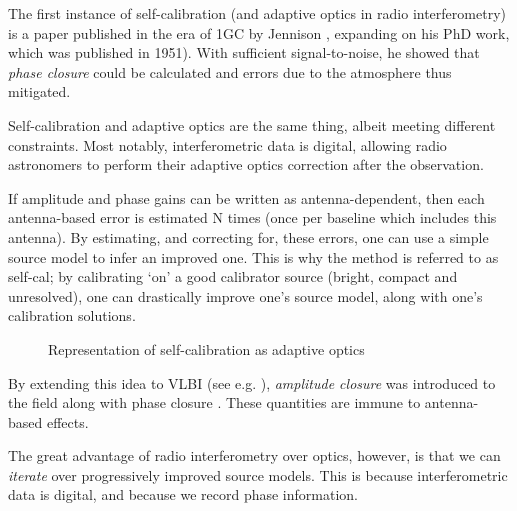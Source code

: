 \pg
The first instance of self-calibration (and adaptive optics in radio interferometry) is a paper published in the era of 1GC by Jennison , expanding on his PhD work, which was published in 1951). With sufficient signal-to-noise, he showed that \emph{phase closure} could be calculated and errors due to the atmosphere thus mitigated.

\pg
Self-calibration and adaptive optics are the same thing, albeit meeting different constraints. Most notably, interferometric data is digital, allowing radio astronomers to perform their adaptive optics correction after the observation.

\pg
If amplitude and phase gains can be written as antenna-dependent, then each antenna-based error is estimated N times (once per baseline which includes this antenna). By estimating, and correcting for, these errors, one can use a simple source model to infer an improved one. This is why the method is referred to as self-cal; by calibrating `on' a good calibrator source (bright, compact and unresolved), one can drastically improve one's source model, along with one's calibration solutions.


\begin{figure}[h!]
\centering
{}
\caption{\label{fig.selfcal} Representation of self-calibration as adaptive optics}
\end{figure}

\pg
By extending this idea to VLBI (see e.g.  ), \emph{amplitude closure} was introduced to the field along with phase closure . These quantities are immune to antenna-based effects.%

\pg
The great advantage of radio interferometry over optics, however, is that we can \emph{iterate} over progressively improved source models. This is because interferometric data is digital, and because we record phase information.

